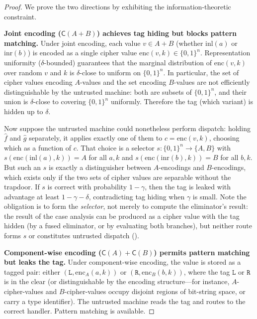 \documentclass[11pt]{article}
\theoremstyle{definition}
\theoremstyle{plain}
\theoremstyle{remark}
\newcommand{\enc}{\mathrm{enc}}
\newcommand{\fhat}{\hat{f}}
\newcommand{\cipher}[1]{\mathsf{C}(#1)}
\newcommand{\B}{\{0,1\}}
\begin{document}
\begin{proof}
We prove the two directions by exhibiting the information-theoretic
constraint.

\medskip
\noindent\textbf{Joint encoding ($\cipher{A+B}$) achieves tag hiding but
blocks pattern matching.}
Under joint encoding, each value $v \in A + B$ (whether $\mathrm{inl}(a)$ or
$\mathrm{inr}(b)$) is encoded as a single cipher value $\enc(v, k) \in \B^n$.
Representation uniformity ($\delta$-bounded) guarantees that the marginal
distribution of $\enc(v, k)$ over random $v$ and $k$ is $\delta$-close to
uniform on $\B^n$.
In particular, the set of cipher values encoding $A$-values and the set
encoding $B$-values are not efficiently distinguishable by the untrusted
machine: both are subsets of $\B^n$, and their union is $\delta$-close to
covering $\B^n$ uniformly.
Therefore the tag (which variant) is hidden up to $\delta$.

Now suppose the untrusted machine could nonetheless perform dispatch:
holding $\fhat$ and $\hat{g}$ separately, it applies exactly one of them
to $c = \enc(v, k)$, choosing which as a function of $c$.
That choice is a selector $s : \B^n \to \{A, B\}$ with
$s(\enc(\mathrm{inl}(a), k)) = A$ for all $a, k$ and
$s(\enc(\mathrm{inr}(b), k)) = B$ for all $b, k$.
But such an $s$ is exactly a distinguisher between $A$-encodings and
$B$-encodings, which exists only if the two sets of cipher values are
separable without the trapdoor.
If $s$ is correct with probability $1 - \gamma$, then the tag is leaked
with advantage at least $1 - \gamma - \delta$, contradicting tag hiding
when $\gamma$ is small.
Note the obligation is to form the \emph{selector}, not merely to compute
the eliminator's result: the result of the case analysis can be produced
as a cipher value with the tag hidden (by a fused eliminator, or by
evaluating both branches), but neither route forms $s$ or constitutes
untrusted dispatch ().

\medskip
\noindent\textbf{Component-wise encoding ($\cipher{A} + \cipher{B}$)
permits pattern matching but leaks the tag.}
Under component-wise encoding, the value is stored as a tagged pair:
either $(\texttt{L}, \enc_A(a, k))$ or $(\texttt{R}, \enc_B(b, k))$,
where the tag $\texttt{L}$ or $\texttt{R}$ is in the clear (or
distinguishable by the encoding structure---for instance, $A$-cipher-values
and $B$-cipher-values occupy disjoint regions of bit-string space, or
carry a type identifier).
The untrusted machine reads the tag and routes to the correct handler.
Pattern matching is available.


\end{proof}
\end{document}
